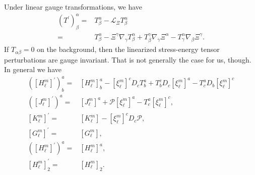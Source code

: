 \documentclass[12pt]{report}
\begin{document}
Under linear gauge transformations, we have
\begin{align}
    \left(T^{\prime}\right)^{\alpha}_{\beta}
    =&
    T^{\alpha}_{\beta}
    -
    \mathcal{L}_{\Xi}T^{\alpha}_{\beta}
    \nonumber\\
    =&
    T^{\alpha}_{\beta}
    -
    \Xi^{\gamma}\nabla_{\gamma}T^{\alpha}_{\beta}
    +
    T^{\gamma}_{\beta}\nabla_{\gamma}\Xi^{\alpha}
    -
    T^{\alpha}_{\gamma}\nabla_{\beta}\Xi^{\gamma}
    .
\end{align}
If $T_{\alpha\beta}=0$ on the background, then the linearized
stress-energy tensor perturbations are gauge invariant. 
That is not generally the case for us, though.
In general we have
\begin{subequations}
\begin{align}
    \left(\left[H^m_{\ell}\right]^{\prime}\right)^a_{b}
    =&
    \left[H^m_{\ell}\right]^a_{b}
    -
    \left[\xi^m_{\ell}\right]^cD_cT^a_{b}
    +
    T^{c}_{b}D_c\left[\xi^m_{\ell}\right]^a
    -
    T^{a}_{c}D_b\left[\xi^m_{\ell}\right]^c
    \\
    \left(\left[J^m_{\ell}\right]^{\prime}\right)^a
    =&
    \left[J^m_{\ell}\right]^a
    +
    \mathcal{P}\left[\xi^m_{\ell}\right]^a 
    -
    T^a_c\left[\xi^m_{\ell}\right]^c 
    ,\\
    \left[K^m_{\ell}\right]^{\prime}
    =&
    \left[K^m_{\ell}\right]
    -
    \left[\xi^m_{\ell}\right]^cD_c\mathcal{P}
    ,\\
    \left[G^m_{\ell}\right]^{\prime}
    =&
    \left[G^m_{\ell}\right]
    ,\\
    \left(\left[H^m_{\ell}\right]^{\prime}\right)^a
    =&
    \left[H^m_{\ell}\right]^a
    ,\\
    \left[H^m_{\ell}\right]^{\prime}_2
    =&
    \left[H^m_{\ell}\right]_2
    .
\end{align}
\end{subequations}
\end{document}
